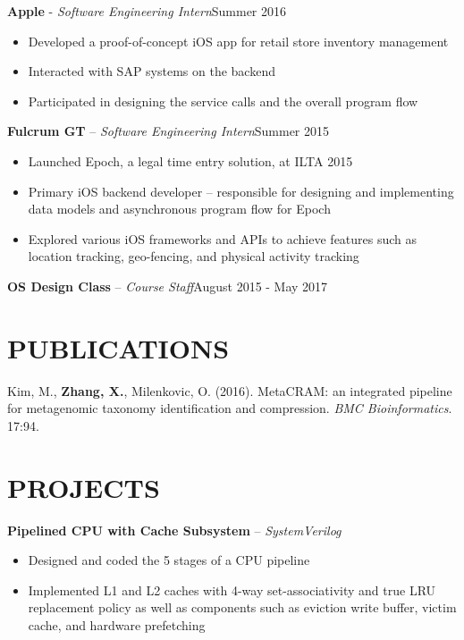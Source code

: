 \documentclass[resmargin]{res}
\begin{document}
\begin{resume}
	\vspace{-3mm}
	{\bf Apple} - {\sl Software Engineering Intern}\hfill Summer 2016
		\begin{itemize} \itemsep -1pt
		\item Developed a proof-of-concept iOS app for retail store inventory management
		\item Interacted with SAP systems on the backend
		\item Participated in designing the service calls and the overall program flow 
	\end{itemize}
	
	\vspace{-3mm}
	{\bf Fulcrum GT} -- {\sl Software Engineering Intern}\hfill Summer 2015
		\begin{itemize} \itemsep -1pt
		\item Launched Epoch, a legal time entry solution, at ILTA 2015
		\item Primary iOS backend developer -- responsible for designing and implementing data models and asynchronous program flow for Epoch
		\item Explored various iOS frameworks and APIs to achieve features such as location tracking, geo-fencing, and physical activity tracking
	\end{itemize}
		
	\vspace{-3mm}
	{\bf OS Design Class} -- {\sl Course Staff}\hfill August 2015 - May 2017

\vspace{-3mm}
\section{PUBLICATIONS}
	\textnormal{Kim, M., \textbf{Zhang, X.}, Milenkovic, O. (2016). MetaCRAM: an integrated pipeline for metagenomic taxonomy identification and compression. \textit{BMC Bioinformatics}. 17:94.}
 
\vspace{-3mm}
\section{PROJECTS} 

	{\bf Pipelined CPU with Cache Subsystem} -- {\sl SystemVerilog} 
	\begin{itemize} \itemsep -1pt
	    \item Designed and coded the 5 stages of a CPU pipeline 
	    \item Implemented L1 and L2 caches with 4-way set-associativity and true LRU replacement policy as well as components such as eviction write buffer, victim cache, and hardware prefetching
	\end{itemize}
	

\end{resume}
\end{document}
